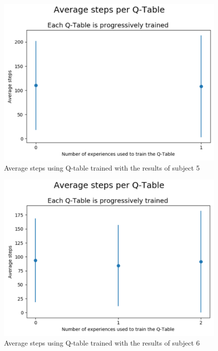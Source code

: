 \documentclass[journal]{IEEEtran}
\begin{document}
\begin{figure}[h]
        \centering
        \includegraphics[scale=0.4]{Images/Average_steps/manu.png} 
        \caption{Average steps using Q-table trained with the results of subject 5}
        \label{fig:avg_steps_5}
\end{figure}

\begin{figure}[h]
        \centering
        \includegraphics[scale=0.4]{Images/Average_steps/marta.png} 
        \caption{Average steps using Q-table trained with the results of subject 6}
        \label{fig:avg_steps_6}
\end{figure}
\end{document}
